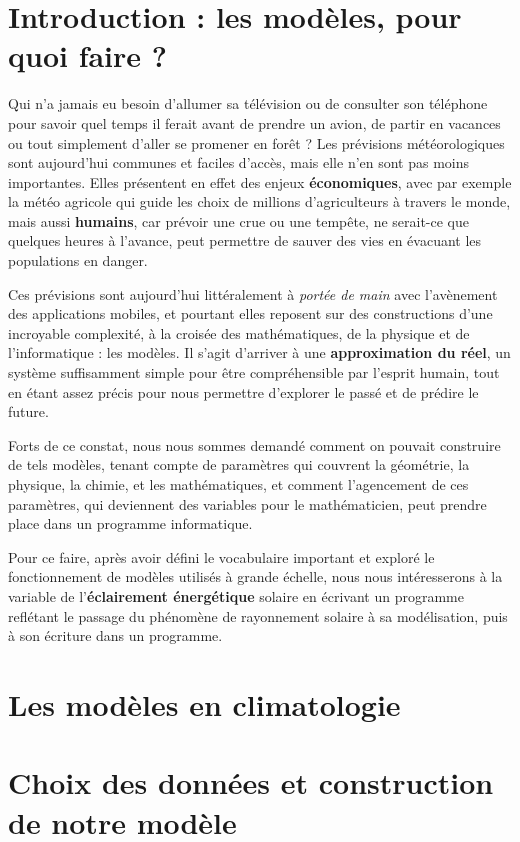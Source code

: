 \documentclass[12pt]{article}
\begin{document}
\clearpage
\section{Introduction : les modèles, pour quoi faire ?} 
Qui n'a jamais eu besoin d'allumer sa télévision ou de consulter son téléphone pour savoir quel temps il ferait avant de prendre un avion, de partir en vacances ou tout simplement d'aller se promener en forêt ? Les prévisions météorologiques sont aujourd'hui communes et faciles d'accès, mais elle n'en sont pas moins importantes. Elles présentent en effet des enjeux \textbf{économiques}, avec par exemple la météo agricole qui guide les choix de millions d'agriculteurs à travers le monde, mais aussi \textbf{humains}, car prévoir une crue ou une tempête, ne serait-ce que quelques heures à l'avance, peut permettre de sauver des vies en évacuant les populations en danger.

Ces prévisions sont aujourd'hui littéralement à \textit{portée de main} avec l'avènement des applications mobiles, et pourtant elles reposent sur des constructions d'une incroyable complexité, à la croisée des mathématiques, de la physique et de l'informatique : les modèles.
Il s'agit d'arriver à une \textbf{approximation du réel}, un système suffisamment simple pour être compréhensible par l'esprit humain, tout en étant assez précis pour nous permettre d'explorer le passé et de prédire le future.

Forts de ce constat, nous nous sommes demandé comment on pouvait construire de tels modèles, tenant compte de paramètres qui couvrent la géométrie, la physique, la chimie, et les mathématiques, et comment l’agencement de ces paramètres, qui deviennent des variables pour le mathématicien, peut prendre place dans un programme informatique.

Pour ce faire, après avoir défini le vocabulaire important et exploré le fonctionnement de modèles utilisés à grande échelle, nous nous intéresserons à la variable de l'\textbf{éclairement énergétique} solaire en écrivant un programme reflétant le passage du phénomène de rayonnement solaire à sa modélisation, puis à son écriture dans un programme.


\section{Les modèles en climatologie}



\section{Choix des données et construction de notre modèle}
\end{document}
